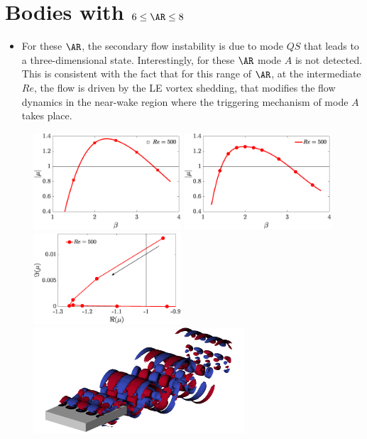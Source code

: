 \documentclass[onecolumn,notitlepage,superscriptaddress, amsmath,amssymb,longbibliographyaps,floatfix]{revtex4-1}
\begin{document}
\section{Bodies with $6 \le \AR \le 8$}

\begin{itemize}
  \item For these $\AR$, the secondary flow instability is due to mode $QS$ that leads to a three-dimensional state. Interestingly, for these $\AR$ mode $A$ is not detected. This is consistent with the fact that for this range of $\AR$, at the intermediate $Re$, the flow is driven by the LE vortex shedding, that modifies the flow dynamics in the near-wake region where the triggering mechanism of mode $A$ takes place. 
\end{itemize}

\begin{figure}
  \centering
  \includegraphics[width=0.49\textwidth]{./fig/AR7s/multipliers_AR6.eps}  
  \includegraphics[width=0.49\textwidth]{./fig/AR7s/multipliers_AR7.eps}
  \includegraphics[width=0.49\textwidth]{./fig/AR7s/multipliers_AR7_b.eps}
  \includegraphics[width=0.7\textwidth]{./fig/AR7s/Floqetmode_beta_2p2_Re500_AR7.png}

\end{figure}
\end{document}
